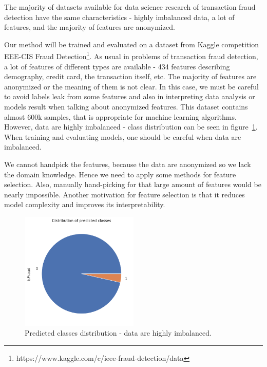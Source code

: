 \documentclass[runningheads]{llncs}
\begin{document}
The majority of datasets available for data science research of transaction fraud detection have the same characteristics - highly imbalanced data, a lot of features, and the majority of features are anonymized.

Our method will be trained and evaluated on a dataset from Kaggle competition EEE-CIS Fraud Detection\footnote{https://www.kaggle.com/c/ieee-fraud-detection/data}. As usual in problems of transaction fraud detection, a lot of features of different types are available - 434 features describing demography, credit card, the transaction itself, etc. The majority of features are anonymized or the meaning of them is not clear. In this case, we must be careful to avoid labels leak from some features and also in interpreting data analysis or models result when talking about anonymized features. This dataset contains almost 600k samples, that is appropriate for machine learning algorithms. However, data are highly imbalanced - class distribution can be seen in figure~\ref{fig:classes}. When training and evaluating models, one should be careful when data are imbalanced.

We cannot handpick the features, because the data are anonymized so we lack the domain knowledge. Hence we need to apply some methods for feature selection. Also, manually hand-picking for that large amount of features would be nearly impossible. Another motivation for feature selection is that it reduces model complexity and improves its interpretability.

\begin{figure}[ht]
	\begin{center}
	    \includegraphics[width=0.5\textwidth]{figures/class_distribution.png}
    \end{center}
	\caption{Predicted classes distribution - data are highly imbalanced.}
	\label{fig:classes}
\end{figure}
\end{document}
